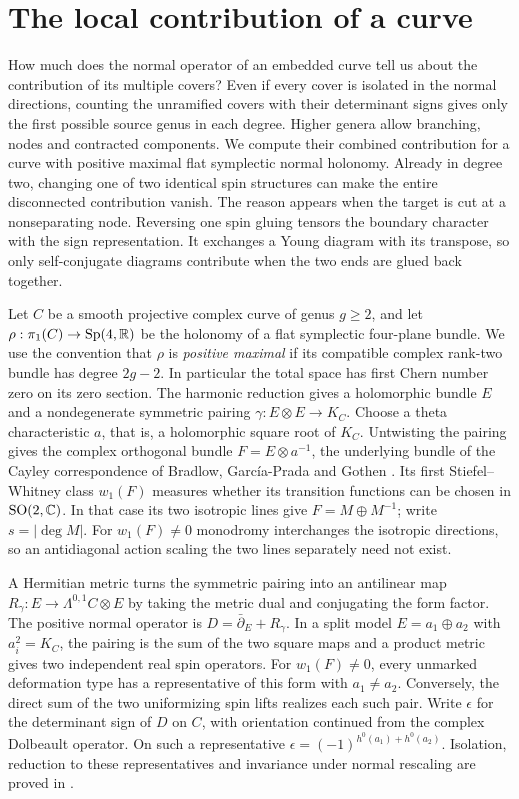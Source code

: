 \section{The local contribution of a curve}\label{sec:partition}

How much does the normal operator of an embedded curve tell us about
the contribution of its multiple covers? Even if every cover is
isolated in the normal directions, counting the unramified covers with
their determinant signs gives only the first possible source genus in
each degree. Higher genera allow branching, nodes and contracted
components. We compute their combined contribution for a curve with
positive maximal flat symplectic normal holonomy. Already in degree
two, changing one of two identical spin structures can make the entire
disconnected contribution vanish. The reason appears when the target
is cut at a nonseparating node. Reversing one spin gluing tensors the
boundary character with the sign representation. It exchanges a Young
diagram with its transpose, so only self-conjugate diagrams contribute
when the two ends are glued back together.

Let \(C\) be a smooth projective complex curve of genus \(g\ge2\), and
let \(\rho:\pi_1(C)\to{\rm Sp}(4,\mathbb R)\) be the holonomy of a flat
symplectic four-plane bundle. We use the convention that \(\rho\) is
\emph{positive maximal} if its compatible complex rank-two bundle
has degree \(2g-2\). In particular the total space has first Chern
number zero on its zero section.
The harmonic reduction gives a holomorphic bundle \(E\) and a
nondegenerate symmetric pairing \(\gamma:E\otimes E\to K_C\).
Choose a theta characteristic \(a\), that is, a holomorphic square
root of \(K_C\). Untwisting the pairing gives the complex orthogonal
bundle \(F=E\otimes a^{-1}\), the underlying bundle of the Cayley
correspondence of Bradlow, Garc\'ia-Prada and Gothen \cite{bgg}. Its first Stiefel--Whitney class \(w_1(F)\) measures
whether its transition functions can be chosen in \({\rm SO}(2,\mathbb C)\).
In that case its two isotropic lines give \(F=M\oplus M^{-1}\);
write \(s=|\deg M|\). For \(w_1(F)\ne0\) monodromy interchanges the
isotropic directions, so an antidiagonal action scaling the two
lines separately need not exist.

A Hermitian metric turns the symmetric pairing into an antilinear map
\(R_\gamma:E\to\Lambda^{0,1}C\otimes E\) by taking the metric dual and
conjugating the form factor. The positive normal operator is
\(D=\bar\partial_E+R_\gamma\). In a split model \(E=a_1\oplus a_2\)
with \(a_i^2=K_C\), the pairing is the sum of the two square maps and a
product metric gives two independent real spin operators. For
\(w_1(F)\ne0\), every unmarked deformation type has a representative
of this form with \(a_1\ne a_2\). Conversely, the direct sum of the two uniformizing spin lifts realizes each such pair. Write \(\epsilon\) for the
determinant sign of \(D\) on \(C\), with orientation continued from the
complex Dolbeault operator. On such a representative
\(\epsilon=(-1)^{h^0(a_1)+h^0(a_2)}\).
Isolation, reduction to these representatives and invariance under
normal rescaling are proved in
\cite[Lemma~14.1, Propositions~14.2 and~15.4, and Appendices~D--E]{WueUnramified}.

